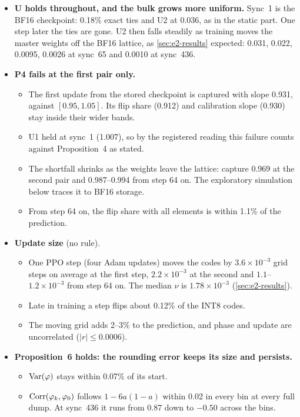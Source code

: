 \documentclass[11pt]{article}
\begin{document}
\begin{itemize}
\item \textbf{U holds throughout, and the bulk grows more uniform.} Sync~1 is the BF16 checkpoint: 0.18\% exact ties and U2 at 0.036, as in the static part. One step later the ties are gone. U2 then falls steadily as training moves the master weights off the BF16 lattice, as \cref{sec:e2-results} expected: 0.031, 0.022, 0.0095, 0.0026 at sync~65 and 0.0010 at sync~436.
\item \textbf{P4 fails at the first pair only.}
  \begin{itemize}
  \item The first update from the stored checkpoint is captured with slope 0.931, against $[0.95,1.05]$. Its flip share (0.912) and calibration slope (0.930) stay inside their wider bands.
  \item U1 held at sync~1 (1.007), so by the registered reading this failure counts against Proposition~4 as stated.
  \item The shortfall shrinks as the weights leave the lattice: capture 0.969 at the second pair and 0.987--0.994 from step 64 on. The exploratory simulation below traces it to BF16 storage.
  \item From step 64 on, the flip share with all elements is within 1.1\% of the prediction.
  \end{itemize}
\item \textbf{Update size} (no rule).
  \begin{itemize}
  \item One PPO step (four Adam updates) moves the codes by $3.6\times10^{-3}$ grid steps on average at the first step, $2.2\times10^{-3}$ at the second and $1.1$--$1.2\times10^{-3}$ from step 64 on. The median $\nu$ is $1.78\times10^{-3}$ (\cref{sec:e2-results}).
  \item Late in training a step flips about 0.12\% of the INT8 codes.
  \item The moving grid adds 2--3\% to the prediction, and phase and update are uncorrelated ($|r|\le0.0006$).
  \end{itemize}
\item \textbf{Proposition~6 holds: the rounding error keeps its size and persists.}
  \begin{itemize}
  \item $\operatorname{Var}(\varphi)$ stays within 0.07\% of its start.
  \item $\operatorname{Corr}(\varphi_k,\varphi_0)$ follows $1-6a(1-a)$ within 0.02 in every bin at every full dump. At sync~436 it runs from 0.87 down to $-0.50$ across the bins.

\end{itemize}
\end{itemize}
\end{document}
